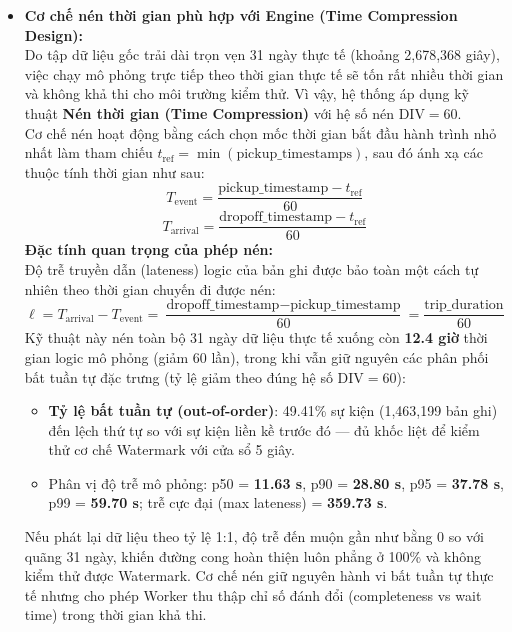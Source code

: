 \documentclass[12pt,a4paper]{article}
\begin{document}
\begin{itemize}[leftmargin=*]
    \item \textbf{Cơ chế nén thời gian phù hợp với Engine (Time Compression Design):} \\
    Do tập dữ liệu gốc trải dài trọn vẹn 31 ngày thực tế (khoảng 2,678,368 giây), việc chạy mô phỏng trực tiếp theo thời gian thực tế sẽ tốn rất nhiều thời gian và không khả thi cho môi trường kiểm thử. Vì vậy, hệ thống áp dụng kỹ thuật \textbf{Nén thời gian (Time Compression)} với hệ số nén $\text{DIV} = 60$. \\
    Cơ chế nén hoạt động bằng cách chọn mốc thời gian bắt đầu hành trình nhỏ nhất làm tham chiếu $t_{\text{ref}} = \min(\text{pickup\_timestamps})$, sau đó ánh xạ các thuộc tính thời gian như sau:
    {\large
    \begin{equation}
        \boxed{\displaystyle T_{\text{event}} = \frac{\text{pickup\_timestamp} - t_{\text{ref}}}{60}}
    \end{equation}
    }
    {\large
    \begin{equation}
        \boxed{\displaystyle T_{\text{arrival}} = \frac{\text{dropoff\_timestamp} - t_{\text{ref}}}{60}}
    \end{equation}
    }
    \textbf{Đặc tính quan trọng của phép nén:} \\
    Độ trễ truyền dẫn (lateness) logic của bản ghi được bảo toàn một cách tự nhiên theo thời gian chuyến đi được nén:
    {\large
    \begin{equation}
        \boxed{\displaystyle \ell = T_{\text{arrival}} - T_{\text{event}} = \frac{\text{dropoff\_timestamp} - \text{pickup\_timestamp}}{60} = \frac{\text{trip\_duration}}{60}}
    \end{equation}
    }
    Kỹ thuật này nén toàn bộ 31 ngày dữ liệu thực tế xuống còn \textbf{12.4 giờ} thời gian logic mô phỏng (giảm 60 lần), trong khi vẫn giữ nguyên các phân phối bất tuần tự đặc trưng (tỷ lệ giảm theo đúng hệ số $\text{DIV}=60$):
    \begin{itemize}[label={-}]
        \item \textbf{Tỷ lệ bất tuần tự (out-of-order)}: 49.41\% sự kiện (1,463,199 bản ghi) đến lệch thứ tự so với sự kiện liền kề trước đó --- đủ khốc liệt để kiểm thử cơ chế Watermark với cửa sổ 5 giây.
        \item Phân vị độ trễ mô phỏng: p50 = \textbf{11.63 s}, p90 = \textbf{28.80 s}, p95 = \textbf{37.78 s}, p99 = \textbf{59.70 s}; trễ cực đại (max lateness) = \textbf{359.73 s}.
    \end{itemize}
    Nếu phát lại dữ liệu theo tỷ lệ 1:1, độ trễ đến muộn gần như bằng 0 so với quãng 31 ngày, khiến đường cong hoàn thiện luôn phẳng ở 100\% và không kiểm thử được Watermark. Cơ chế nén giữ nguyên hành vi bất tuần tự thực tế nhưng cho phép Worker thu thập chỉ số đánh đổi (completeness vs wait time) trong thời gian khả thi.


\end{itemize}
\end{document}
